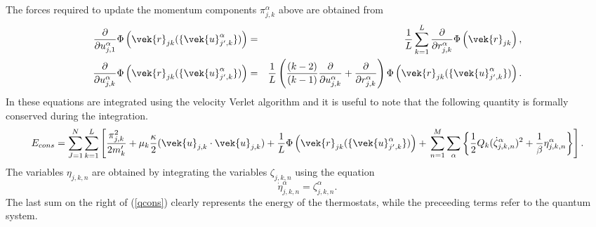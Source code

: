 The forces required to update the momentum components
${\pi}_{j,k}^{\alpha}$ above are obtained from
\begin{eqnarray}
  \frac{\partial}{\partial u_{j,1}^{\alpha}}\Phi \left (\vek{r}_{jk}(\{\vek{u}_{j',k}^{\alpha}\}) \right )&=&
  \frac{1}{L}\sum_{k=1}^{L}\frac{\partial}{\partial r_{j,k}^{\alpha}}\Phi\left (\vek{r}_{jk} \right ), \nonumber \\
  \frac{\partial}{\partial u_{j,k}^{\alpha}}\Phi\left (\vek{r}_{jk}(\{\vek{u}_{j',k}^{\alpha}\}) \right )&=&
  \frac{1}{L}\left ( \frac{(k-2)}{(k-1)}\frac{\partial}{\partial u_{j,k}^{\alpha}}+
  \frac{\partial}{\partial r_{j,k}^{\alpha}} \right ) \Phi\left (\vek{r}_{jk}(\{\vek{u}_{j',k}^{\alpha}\}) \right ).
\end{eqnarray}
In \DD{} these equations are integrated using the velocity Verlet
algorithm and it is useful to note that the following quantity is
formally conserved during the integration.
\begin{equation}
  E_{cons}=\sum_{J=1}^{N}\sum_{k=1}^{L} \left [ \frac{\pi_{j,k}^{2}}{2 m_{k}'}+
    \mu_{k} \frac{\kappa}{2} (\vek{u}_{j,k} \cdot \vek{u}_{j,k})+
    \frac{1}{L}\Phi\left (\vek{r}_{jk}(\{\vek{u}_{j',k}^{\alpha}\}) \right )+ \newline
    \sum_{n=1}^{M} \sum_{\alpha} \left \{ \frac{1}{2}Q_{k}({\dot \zeta}_{j,k,n}^{\alpha})^{2}
    +\frac{1}{\beta}\eta_{j,k,n}^{\alpha} \right \} \right ]. \label{qcons}
\end{equation}
The variables $\eta_{j,k,n}$ are obtained by integrating the variables
$\zeta_{j,k,n}$ using the equation
\begin{equation}
  {\dot \eta}_{j,k,n}^{\alpha}=\zeta_{j,k,n}^{\alpha}.
\end{equation}
The last sum on the right of (\ref{qcons}) clearly represents the
energy of the thermostats, while the preceeding terms refer to the quantum system.

